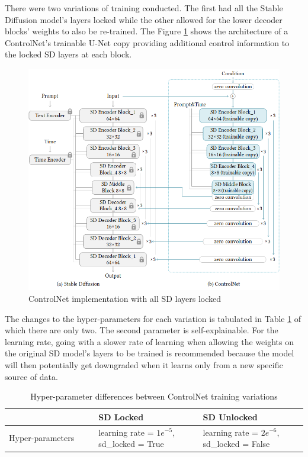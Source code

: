 There were two variations of training conducted. The first had all the Stable Diffusion model's layers locked while the other allowed for the lower decoder blocks' weights to also be re-trained. The Figure \ref{fig:controlnet-sd-locked} 
shows the architecture of a ControlNet's trainable U-Net copy providing additional control information to the locked SD layers at each block. 
\begin{figure}[ht]
    \centering
    \includegraphics[width=1\linewidth]{4_ResearchMethodology/figures/training_sd_locked.png}
    \caption[ControlNet architecture]{ControlNet implementation with all SD layers locked \parencite[Figure 3, p. 4 ]{Zhang2023AddingModels}}
    \label{fig:controlnet-sd-locked}
\end{figure}
The changes to the hyper-parameters for each variation is tabulated in Table \ref{tab:training-variation} of which there are only two. The second parameter is self-explainable. For the learning rate, going with a slower rate of learning when allowing the weights on the original SD model's layers to be trained is recommended because the model will then potentially get downgraded when it learns only from a new specific source of data.

\begin{table}[H]
\begin{center}
\begin{tabular}{|>{\raggedright\arraybackslash}p{0.3\linewidth}|>{\raggedright\arraybackslash}p{0.35\linewidth}|>{\raggedright\arraybackslash}p{0.35\linewidth}|}
\hline 
\textbf{}& \textbf{SD Locked}& \textbf{SD Unlocked}\\ \hline 
Hyper-parameters& learning rate = $1e^{-5}$, sd\_locked = True& learning rate = $2e^{-6}$, sd\_locked = False\\ \hline
\end{tabular}
\caption[Hyper-parameter differences between ControlNet training variations]{Hyper-parameter differences between ControlNet training variations}\label{tab:training-variation}
\end{center}
\end{table}

